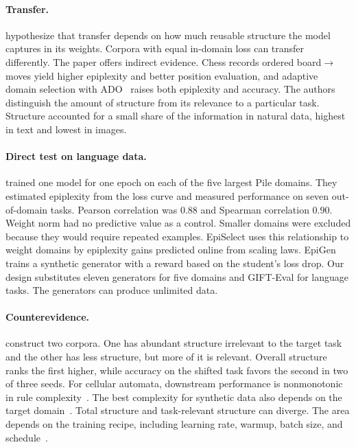 \documentclass[11pt]{article}
\begin{document}
\paragraph{Transfer.} \citet{finzi2026} hypothesize that transfer depends on how
much reusable structure the model captures in its weights. Corpora with equal
in-domain loss can transfer differently. The paper offers indirect evidence.
Chess records ordered board$\to$moves yield higher epiplexity and better position
evaluation, and adaptive domain selection with ADO~\citep{jiang2025} raises both
epiplexity and accuracy. The authors distinguish the amount of structure from its
relevance to a particular task. Structure accounted for a small share of the
information in natural data, highest in text and lowest in images.

\paragraph{Direct test on language data.} \citet{su2026} trained one model for one
epoch on each of the five largest Pile domains. They estimated epiplexity from the
loss curve and measured performance on seven out-of-domain tasks. Pearson
correlation was $0.88$ and Spearman correlation $0.90$. Weight norm had no predictive
value as a control. Smaller domains were excluded because they would require
repeated examples. EpiSelect uses this relationship to weight domains by epiplexity
gains predicted online from scaling laws. EpiGen trains a synthetic generator with
a reward based on the student's loss drop. Our design substitutes eleven generators
for five domains and GIFT-Eval for language tasks. The generators can produce
unlimited data.

\paragraph{Counterevidence.} \citet{li2026} construct two corpora. One has abundant
structure irrelevant to the target task and the other has less structure, but more
of it is relevant. Overall structure ranks the first higher, while accuracy on the
shifted task favors the second in two of three seeds. For cellular automata,
downstream performance is nonmonotonic in rule complexity~\citep{zhang2024}.
The best complexity for synthetic data also depends on the target domain~\citep{lee2026}.
Total structure and task-relevant structure can diverge. The area depends on the
training recipe, including learning rate, warmup, batch size, and
schedule~\citep{bornschein2022}.
\end{document}
